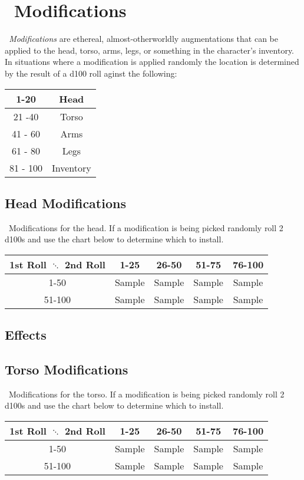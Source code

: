 \section{\magit\ Modifications}\label{sec:magi_mods}
\emph{\magit\ Modifications} are ethereal, almost-otherworldly augmentations that can be applied to the head, torso, arms, legs, or something in the character's inventory. In situations where a modification is applied randomly the location is determined by the result of a d100 roll aginst the following:
\begin{center}
\begin{tabular}{c | c}
1-20 & Head \\
\hline
21 -40 & Torso \\
\hline
41 - 60 & Arms \\
\hline
61 - 80 & Legs \\
\hline
81 - 100 & Inventory \\
\end{tabular}
\end{center}

\subsection{Head Modifications}
\magit\ Modifications for the head. If a modification is being picked randomly roll 2 d100s and use the chart below to determine which to install.
\begin{center}
\begin{tabular}{c | c | c | c | c}
1st Roll $\ddots$ 2nd Roll & 1-25 & 26-50 & 51-75 & 76-100 \\
\hline
1-50 & Sample & Sample & Sample & Sample\\
\hline
51-100 & Sample & Sample & Sample & Sample\\
\end{tabular}
\end{center}
\subsection*{Effects}
\begin{multicols}{2}
\end{multicols}
\clearpage

\subsection{Torso Modifications}
\magit\ Modifications for the torso. If a modification is being picked randomly roll 2 d100s and use the chart below to determine which to install.
\begin{center}
\begin{tabular}{c | c | c | c | c}
1st Roll $\ddots$ 2nd Roll & 1-25 & 26-50 & 51-75 & 76-100 \\
\hline
1-50 & Sample & Sample & Sample & Sample\\
\hline
51-100 & Sample & Sample & Sample & Sample\\
\end{tabular}
\end{center}
